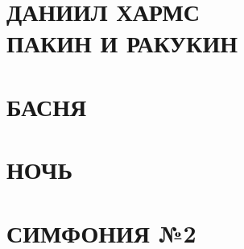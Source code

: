 \documentclass[11pt]{article}
\begin{document}
\section*{ДАНИИЛ ХАРМС \\ ПАКИН И РАКУКИН}
\indent


\section*{БАСНЯ} 
\indent 


\section*{НОЧЬ}
\indent


\section*{}
\indent 


\section*{СИМФОНИЯ №2} 
\indent

\end{document}
